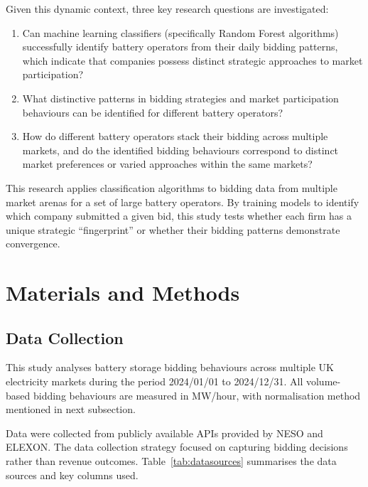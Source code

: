 \documentclass[12pt,a4paper]{article}
\begin{document}
Given this dynamic context, three key research questions are investigated:
\begin{enumerate}
    \item Can machine learning classifiers (specifically Random Forest algorithms) successfully identify battery operators from their daily bidding patterns, which indicate that companies possess distinct strategic approaches to market participation?
    \item What distinctive patterns in bidding strategies and market participation behaviours can be identified for different battery operators?
    \item How do different battery operators stack their bidding across multiple markets, and do the identified bidding behaviours correspond to distinct market preferences or varied approaches within the same markets?
\end{enumerate}

This research applies classification algorithms to bidding data from multiple market arenas for a set of large battery operators. By training models to identify which company submitted a given bid, this study tests whether each firm has a unique strategic ``fingerprint'' or whether their bidding patterns demonstrate convergence.

\section{Materials and Methods}

\subsection{Data Collection}
This study analyses battery storage bidding behaviours across multiple UK electricity markets during the period 2024/01/01 to 2024/12/31. All volume-based bidding behaviours are measured in MW/hour, with normalisation method mentioned in next subsection.

Data were collected from publicly available APIs provided by NESO and ELEXON. The data collection strategy focused on capturing bidding decisions rather than revenue outcomes. Table~\ref{tab:datasources} summarises the data sources and key columns used.
\end{document}
